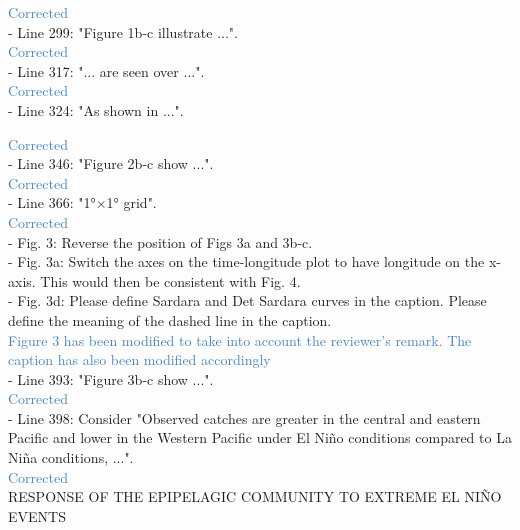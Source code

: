\documentclass[12pt]{article}
\newcommand{\resp}[1]{\textcolor{SteelBlue}{#1}}
\begin{document}
\resp{Corrected}\\

- Line 299: "Figure 1b-c illustrate ...".\\

\resp{Corrected}	\\

- Line 317: "... are seen over ...".\\

\resp{Corrected}\\

- Line 324: "As shown in ...".

\resp{Corrected}\\

- Line 346: "Figure 2b-c show ...".\\

\resp{Corrected}\\

- Line 366: "1°×1° grid".\\

\resp{Corrected} \\

- Fig. 3: Reverse the position of Figs 3a and 3b-c.\\

- Fig. 3a: Switch the axes on the time-longitude plot to have longitude on the x-axis. This would then be consistent with Fig. 4.\\

- Fig. 3d: Please define Sardara and Det Sardara curves in the caption. Please define the meaning of the dashed line in the caption.\\

\resp{Figure 3 has been modified to take into account the reviewer's remark. The caption has also been modified accordingly} \\

- Line 393: "Figure 3b-c show ...".\\

\resp{Corrected} \\

- Line 398: Consider "Observed catches are greater in the central and eastern Pacific and lower in the Western Pacific under El Niño conditions compared to La Niña conditions, ...".\\

\resp{Corrected} \\

RESPONSE OF THE EPIPELAGIC COMMUNITY TO EXTREME EL NIÑO EVENTS\\
\end{document}
